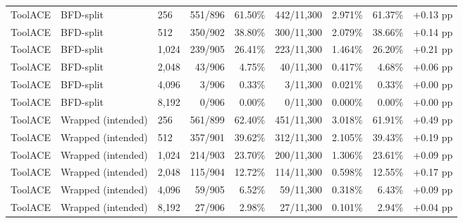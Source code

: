 \begin{longtable}{lllrrrrrr}
ToolACE & BFD-split & 256 & 551/896 & 61.50\% & 442/11,300 & 2.971\% & 61.37\% & +0.13 pp \\
ToolACE & BFD-split & 512 & 350/902 & 38.80\% & 300/11,300 & 2.079\% & 38.66\% & +0.14 pp \\
ToolACE & BFD-split & 1,024 & 239/905 & 26.41\% & 223/11,300 & 1.464\% & 26.20\% & +0.21 pp \\
ToolACE & BFD-split & 2,048 & 43/906 & 4.75\% & 40/11,300 & 0.417\% & 4.68\% & +0.06 pp \\
ToolACE & BFD-split & 4,096 & 3/906 & 0.33\% & 3/11,300 & 0.021\% & 0.33\% & +0.00 pp \\
ToolACE & BFD-split & 8,192 & 0/906 & 0.00\% & 0/11,300 & 0.000\% & 0.00\% & +0.00 pp \\
ToolACE & Wrapped (intended) & 256 & 561/899 & 62.40\% & 451/11,300 & 3.018\% & 61.91\% & +0.49 pp \\
ToolACE & Wrapped (intended) & 512 & 357/901 & 39.62\% & 312/11,300 & 2.105\% & 39.43\% & +0.19 pp \\
ToolACE & Wrapped (intended) & 1,024 & 214/903 & 23.70\% & 200/11,300 & 1.306\% & 23.61\% & +0.09 pp \\
ToolACE & Wrapped (intended) & 2,048 & 115/904 & 12.72\% & 114/11,300 & 0.598\% & 12.55\% & +0.17 pp \\
ToolACE & Wrapped (intended) & 4,096 & 59/905 & 6.52\% & 59/11,300 & 0.318\% & 6.43\% & +0.09 pp \\
ToolACE & Wrapped (intended) & 8,192 & 27/906 & 2.98\% & 27/11,300 & 0.101\% & 2.94\% & +0.04 pp \\

\end{longtable}